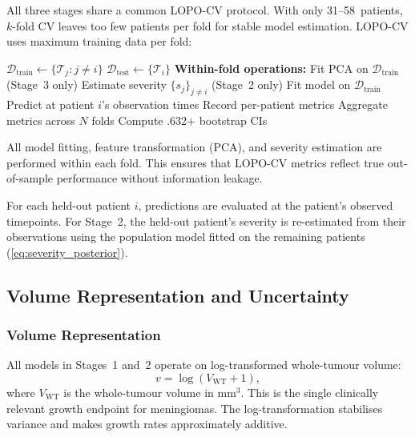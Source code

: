 All three stages share a common LOPO-CV protocol. With only 31--58~patients,
$k$-fold CV leaves too few patients per fold for stable model estimation.
LOPO-CV uses maximum training data per fold:

\begin{algorithm}[H]
  \caption{LOPO-CV Evaluation Protocol (shared across all stages)}
  \label{alg:lopo}
  \begin{algorithmic}[1]
      \STATE $\mathcal{D}_{\text{train}} \leftarrow
        \{\mathcal{T}_j : j \neq i\}$ 
      \STATE $\mathcal{D}_{\text{test}} \leftarrow \{\mathcal{T}_i\}$
      \STATE \textbf{Within-fold operations:}
      \STATE \quad Fit PCA on $\mathcal{D}_{\text{train}}$ (Stage~3 only)
      \STATE \quad Estimate severity $\{s_j\}_{j \neq i}$ (Stage~2 only)
      \STATE \quad Fit model on $\mathcal{D}_{\text{train}}$
      \STATE \quad Predict at patient $i$'s observation times
      \STATE \quad Record per-patient metrics
    \ENDFOR
    \STATE Aggregate metrics across $N$ folds
    \STATE Compute .632+ bootstrap CIs
  \end{algorithmic}
\end{algorithm}

All model fitting, feature transformation (PCA), and severity estimation
are performed within each fold. This ensures that LOPO-CV metrics reflect
true out-of-sample performance without information leakage.

For each held-out patient $i$, predictions are evaluated at the patient's
observed timepoints. For Stage~2, the held-out patient's severity is
re-estimated from their observations using the population model fitted on the
remaining patients (\cref{eq:severity_posterior}).

\subsection{Volume Representation and Uncertainty}
\label{sec:growth:decoder}

\subsubsection{Volume Representation}

All models in Stages~1 and~2 operate on log-transformed whole-tumour volume:
\begin{equation}
  v = \log(V_{\text{WT}} + 1),
  \label{eq:log_vol}
\end{equation}
where $V_{\text{WT}}$ is the whole-tumour volume in mm$^3$. This is the
single clinically relevant growth endpoint for meningiomas. The
log-transformation stabilises variance and makes growth rates approximately
additive.


